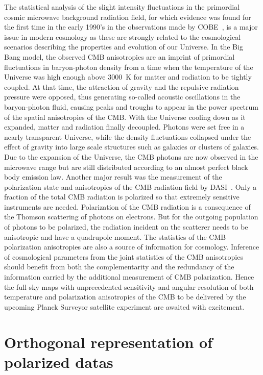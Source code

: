 The statistical analysis of the slight intensity fluctuations in the primordial cosmic microwave background radiation field, for which evidence was 
found for the first time in the early 1990's in the observations made by COBE~\citep{gauss:smoot92}, is a major issue in modern cosmology as these 
are strongly related to the cosmological scenarios describing the properties and evolution of our Universe. In the Big Bang model, the observed CMB 
anisotropies are an imprint of primordial fluctuations in baryon-photon density from a time when the temperature of the Universe was high enough above 
3000~K for matter and radiation to be tightly coupled. At that time, the attraction of gravity and the repulsive radiation pressure were opposed, thus 
generating so-called acoustic oscillations in the baryon-photon fluid, causing peaks and troughs to appear in the power spectrum of the spatial anisotropies 
of the CMB. With the Universe cooling down as it expanded, matter and radiation finally decoupled. Photons were set free in a nearly transparent Universe, 
while the density fluctuations collapsed under the effect of gravity into large scale structures such as galaxies or clusters of galaxies. Due to the 
expansion of the Universe, the CMB photons are now observed in the microwave range but are still distributed according to an almost perfect black body 
emission law. Another major result was the measurement of the polarization state and anisotropies of the CMB radiation field by DASI~\citep{dasi}. 
Only a fraction of the total CMB radiation is polarized so that extremely sensitive instruments are needed. Polarization of the CMB radiation is a 
consequence of the Thomson scattering of photons on electrons. But for the outgoing population of photons to be polarized, the radiation incident on 
the scatterer needs to be anisotropic and have a quadrupole moment. The statistics of the CMB polarization anisotropies are also a source of information 
for cosmology. Inference of cosmological parameters from the joint statistics of the CMB anisotropies should benefit from both the complementarity and 
the redundancy of the information carried by the additional measurement of CMB polarization. Hence the full-sky maps with unprecedented sensitivity and 
angular resolution of both temperature and polarization anisotropies of the CMB to be delivered by the upcoming Planck Surveyor satellite experiment are 
awaited with excitement.

\section{Orthogonal representation of polarized datas}

